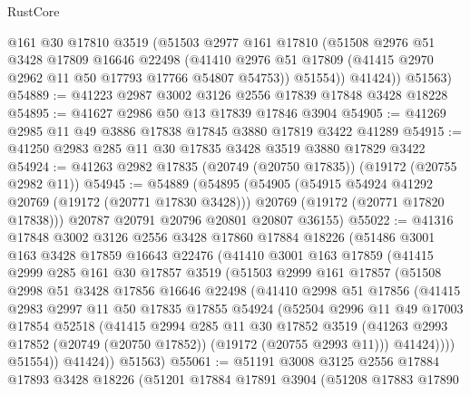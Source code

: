\begin{lexlean}{RustCore}
\begin{coremodule}
          @161
          @30
          @17810
          @3519
          (@51503
            @2977
            @161
            @17810
            (@51508
              @2976
              @51
              @3428
              @17809
              @16646
              @22498
              (@41410 @2976 @51 @17809 (@41415 @2970 @2962 @11 @50 @17793 @17766 @54807 @54753))
              @51554))
          @41424))
      @51563)
@54889 := @41223 @2987 @3002 @3126 @2556 @17839 @17848 @3428 @18228
@54895 := @41627 @2986 @50 @13 @17839 @17846 @3904
@54905 := @41269 @2985 @11 @49 @3886 @17838 @17845 @3880 @17819 @3422 @41289
@54915 := @41250 @2983 @285 @11 @30 @17835 @3428 @3519 @3880 @17829 @3422
@54924 := @41263 @2982 @17835 (@20749 (@20750 @17835)) (@19172 (@20755 @2982 @11))
@54945 := @54889
    (@54895
      (@54905
        (@54915 @54924 @41292 @20769 (@19172 (@20771 @17830 @3428)))
        @20769
        (@19172 (@20771 @17820 @17838)))
      @20787
      @20791
      @20796
      @20801
      @20807
      @36155)
@55022 := @41316
    @17848
    @3002
    @3126
    @2556
    @3428
    @17860
    @17884
    @18226
    (@51486
      @3001
      @163
      @3428
      @17859
      @16643
      @22476
      (@41410
        @3001
        @163
        @17859
        (@41415
          @2999
          @285
          @161
          @30
          @17857
          @3519
          (@51503
            @2999
            @161
            @17857
            (@51508
              @2998
              @51
              @3428
              @17856
              @16646
              @22498
              (@41410
                @2998
                @51
                @17856
                (@41415
                  @2983
                  @2997
                  @11
                  @50
                  @17835
                  @17855
                  @54924
                  (@52504
                    @2996
                    @11
                    @49
                    @17003
                    @17854
                    @52518
                    (@41415
                      @2994
                      @285
                      @11
                      @30
                      @17852
                      @3519
                      (@41263 @2993 @17852 (@20749 (@20750 @17852)) (@19172 (@20755 @2993 @11)))
                      @41424))))
              @51554))
          @41424))
      @51563)
@55061 := @51191
    @3008
    @3125
    @2556
    @17884
    @17893
    @3428
    @18226
    (@51201
      @17884
      @17891
      @3904
      (@51208
        @17883
        @17890

\end{coremodule}
\end{lexlean}
